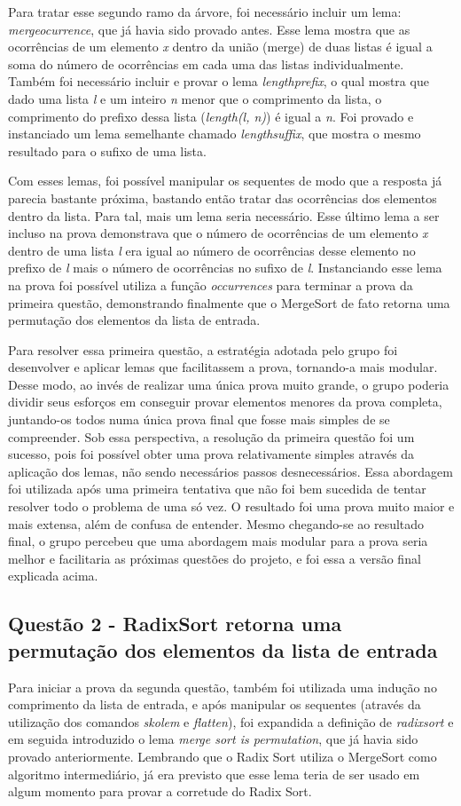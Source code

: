 \documentclass[12pt]{article}
\begin{document}
Para tratar esse segundo ramo da árvore, foi necessário incluir um lema: \textit{mergeocurrence}, que já havia sido provado antes. Esse lema mostra que as ocorrências de um elemento \textit{x} dentro da união (merge) de duas listas é igual a soma do número de ocorrências em cada uma das listas individualmente. Também foi necessário incluir e provar o lema \textit{lengthprefix}, o qual mostra que dado uma lista \textit{l} e um inteiro \textit{n} menor que o comprimento da lista, o comprimento do prefixo dessa lista (\textit{length(l, n)}) é igual a \textit{n}. Foi provado e instanciado um lema semelhante chamado \textit{lengthsuffix}, que mostra o mesmo resultado para o sufixo de uma lista.

Com esses lemas, foi possível manipular os sequentes de modo que a resposta já parecia bastante próxima, bastando então tratar das ocorrências dos elementos dentro da lista. Para tal, mais um lema seria necessário. Esse último lema a ser incluso na prova demonstrava que o número de ocorrências de um elemento \textit{x} dentro de uma lista \textit{l} era igual ao número de ocorrências desse elemento no prefixo de \textit{l} mais o número de ocorrências no sufixo de \textit{l}. Instanciando esse lema na prova foi possível utiliza a função \textit{occurrences} para terminar a prova da primeira questão, demonstrando finalmente que o MergeSort de fato retorna uma permutação dos elementos da lista de entrada.

Para resolver essa primeira questão, a estratégia adotada pelo grupo foi desenvolver e aplicar lemas que facilitassem a prova, tornando-a mais modular. Desse modo, ao invés de realizar uma única prova muito grande, o grupo poderia dividir seus esforços em conseguir provar elementos menores da prova completa, juntando-os todos numa única prova final que fosse mais simples de se compreender. Sob essa perspectiva, a resolução da primeira questão foi um sucesso, pois foi possível obter uma prova relativamente simples através da aplicação dos lemas, não sendo necessários passos desnecessários. Essa abordagem foi utilizada após uma primeira tentativa que não foi bem sucedida de tentar resolver todo o problema de uma só vez. O resultado foi uma prova muito maior e mais extensa, além de confusa de entender. Mesmo chegando-se ao resultado final, o grupo percebeu que uma abordagem mais modular para a prova seria melhor e facilitaria as próximas questões do projeto, e foi essa a versão final explicada acima.

\subsection{Questão 2 - RadixSort retorna uma permutação dos elementos da lista de entrada}
Para iniciar a prova da segunda questão, também foi utilizada uma indução no comprimento da lista de entrada, e após manipular os sequentes (através da utilização dos comandos \textit{skolem} e \textit{flatten}), foi expandida a definição de \textit{radixsort} e em seguida introduzido o lema \textit{merge sort is permutation}, que já havia sido provado anteriormente. Lembrando que o Radix Sort utiliza o MergeSort como algoritmo intermediário, já era previsto que esse lema teria de ser usado em algum momento para provar a corretude do Radix Sort.
\end{document}
